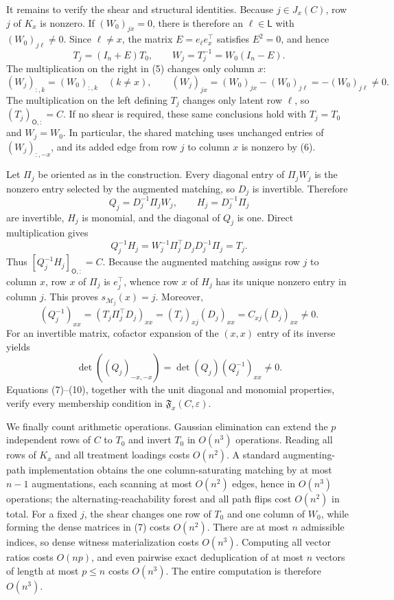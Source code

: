 It remains to verify the shear and structural identities. Because \(j\in J_x(C)\), row \(j\) of \(K_x\) is nonzero. If \((W_0)_{jx}=0\), there is therefore an \(\ell\in\mathsf L\) with \((W_0)_{j\ell}\ne0\). Since \(\ell\ne x\), the matrix \(E=e_\ell e_x^\top\) satisfies \(E^2=0\), and hence
\[
 T_j=(I_n+E)T_0,
 \qquad
 W_j=T_j^{-1}=W_0(I_n-E). \tag{5}
\]
The multiplication on the right in (5) changes only column \(x\):
\[
 (W_j)_{:,k}=(W_0)_{:,k}\quad(k\ne x),
 \qquad
 (W_j)_{jx}=(W_0)_{jx}-(W_0)_{j\ell}=-(W_0)_{j\ell}\ne0. \tag{6}
\]
The multiplication on the left defining \(T_j\) changes only latent row \(\ell\), so \((T_j)_{\mathsf O,:}=C\). If no shear is required, these same conclusions hold with \(T_j=T_0\) and \(W_j=W_0\). In particular, the shared matching uses unchanged entries of \((W_j)_{:,-x}\), and its added edge from row \(j\) to column \(x\) is nonzero by (6).

Let \(\Pi_j\) be oriented as in the construction. Every diagonal entry of \(\Pi_jW_j\) is the nonzero entry selected by the augmented matching, so \(D_j\) is invertible. Therefore
\[
 Q_j=D_j^{-1}\Pi_jW_j,
 \qquad
 H_j=D_j^{-1}\Pi_j   \tag{7}
\]
are invertible, \(H_j\) is monomial, and the diagonal of \(Q_j\) is one. Direct multiplication gives
\[
 Q_j^{-1}H_j
 =W_j^{-1}\Pi_j^\top D_jD_j^{-1}\Pi_j
 =T_j. \tag{8}
\]
Thus \([Q_j^{-1}H_j]_{\mathsf O,:}=C\). Because the augmented matching assigns row \(j\) to column \(x\), row \(x\) of \(\Pi_j\) is \(e_j^\top\), whence row \(x\) of \(H_j\) has its unique nonzero entry in column \(j\). This proves \(s_{\mathcal M_j}(x)=j\). Moreover,
\[
 (Q_j^{-1})_{xx}
 =(T_j\Pi_j^\top D_j)_{xx}
 =(T_j)_{xj}(D_j)_{xx}
 =C_{xj}(D_j)_{xx}\ne0. \tag{9}
\]
For an invertible matrix, cofactor expansion of the \((x,x)\) entry of its inverse yields
\[
 \det((Q_j)_{-x,-x})=\det(Q_j)(Q_j^{-1})_{xx}\ne0. \tag{10}
\]
Equations (7)--(10), together with the unit diagonal and monomial properties, verify every membership condition in \(\mathfrak F_x(C,\varepsilon)\).

We finally count arithmetic operations. Gaussian elimination can extend the \(p\) independent rows of \(C\) to \(T_0\) and invert \(T_0\) in \(O(n^3)\) operations. Reading all rows of \(K_x\) and all treatment loadings costs \(O(n^2)\). A standard augmenting-path implementation obtains the one column-saturating matching by at most \(n-1\) augmentations, each scanning at most \(O(n^2)\) edges, hence in \(O(n^3)\) operations; the alternating-reachability forest and all path flips cost \(O(n^2)\) in total. For a fixed \(j\), the shear changes one row of \(T_0\) and one column of \(W_0\), while forming the dense matrices in (7) costs \(O(n^2)\). There are at most \(n\) admissible indices, so dense witness materialization costs \(O(n^3)\). Computing all vector ratios costs \(O(np)\), and even pairwise exact deduplication of at most \(n\) vectors of length at most \(p\le n\) costs \(O(n^3)\). The entire computation is therefore \(O(n^3)\).

